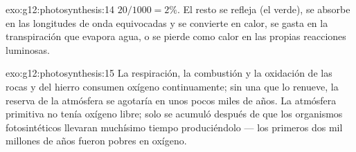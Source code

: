 \begin{solution}{exo:g12:photosynthesis:14}
$20/1000 = 2\%$. El resto se refleja (el verde), se absorbe en las
longitudes de onda equivocadas y se convierte en calor, se gasta en la
transpiración que evapora agua, o se pierde como calor en las propias
reacciones luminosas.
\end{solution}

\begin{solution}{exo:g12:photosynthesis:15}
La respiración, la combustión y la oxidación de las rocas y del hierro
consumen oxígeno continuamente; sin una  que lo renueve, la
reserva de la atmósfera se agotaría en unos pocos miles de años. La
atmósfera primitiva no tenía oxígeno libre; solo se acumuló después de
que los organismos fotosintéticos llevaran muchísimo tiempo
produciéndolo --- los primeros dos mil millones de años fueron pobres
en oxígeno.
\end{solution}

